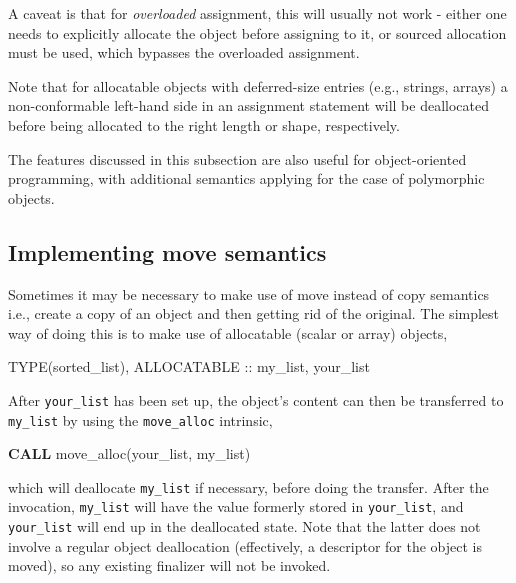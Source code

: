 \documentclass[
]{article}
\newenvironment{Shaded}{}{}
\newcommand{\DataTypeTok}[1]{\textcolor[rgb]{0.56,0.13,0.00}{#1}}
\newcommand{\KeywordTok}[1]{\textcolor[rgb]{0.00,0.44,0.13}{\textbf{#1}}}
\newcommand{\NormalTok}[1]{#1}
\begin{document}
A caveat is that for \emph{overloaded} assignment, this will usually not
work - either one needs to explicitly allocate the object before
assigning to it, or sourced allocation must be used, which bypasses the
overloaded assignment.

Note that for allocatable objects with deferred-size entries (e.g.,
strings, arrays) a non-conformable left-hand side in an assignment
statement will be deallocated before being allocated to the right length
or shape, respectively.

The features discussed in this subsection are also useful for
object-oriented programming, with additional semantics applying for the
case of polymorphic objects.

\subsection{Implementing move
semantics}\label{implementing-move-semantics}

Sometimes it may be necessary to make use of move instead of copy
semantics i.e., create a copy of an object and then getting rid of the
original. The simplest way of doing this is to make use of allocatable
(scalar or array) objects,

\begin{Shaded}
\begin{Highlighting}[]
\DataTypeTok{TYPE(sorted\_list)}\NormalTok{, }\DataTypeTok{ALLOCATABLE} \DataTypeTok{::}\NormalTok{ my\_list, your\_list}
\end{Highlighting}
\end{Shaded}

After \texttt{your\_list} has been set up, the object's content can then
be transferred to \texttt{my\_list} by using the \texttt{move\_alloc}
intrinsic,

\begin{Shaded}
\begin{Highlighting}[]
\KeywordTok{CALL}\NormalTok{ move\_alloc(your\_list, my\_list)}
\end{Highlighting}
\end{Shaded}

which will deallocate \texttt{my\_list} if necessary, before doing the
transfer. After the invocation, \texttt{my\_list} will have the value
formerly stored in \texttt{your\_list}, and \texttt{your\_list} will end
up in the deallocated state. Note that the latter does not involve a
regular object deallocation (effectively, a descriptor for the object is
moved), so any existing finalizer will not be invoked.
\end{document}
